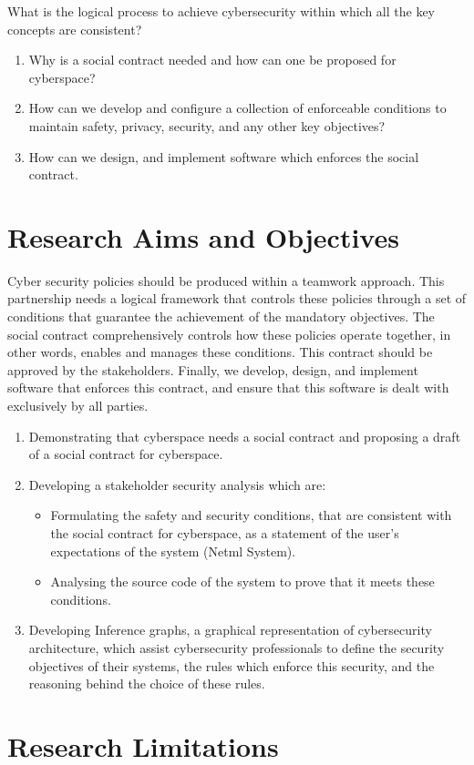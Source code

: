 What is the logical process to achieve cybersecurity within which all the key concepts are consistent?
\begin{enumerate}
\item Why is a social contract needed and how can one be proposed for cyberspace?
\item How can we develop and configure a collection of enforceable conditions to maintain safety, privacy, security, and any other key objectives?
\item How can we design, and implement software which enforces the social contract.%
\end{enumerate}



\section{Research Aims and Objectives}
Cyber security policies should be produced within a teamwork approach.  This partnership needs a logical framework that controls these policies through a set of conditions that guarantee the achievement of the mandatory objectives.  The social contract comprehensively controls how these policies operate together, in other words, enables and manages these conditions.  This contract should be approved by the stakeholders. Finally, we develop, design, and implement software that enforces this contract, and ensure that this software is dealt with exclusively by all parties.
\begin{enumerate}
\item Demonstrating that cyberspace needs a social contract and proposing a draft of a social contract for cyberspace.
\item Developing a stakeholder security analysis which are: 
\begin{itemize}
\item Formulating the safety and security conditions, that are consistent with the social contract for cyberspace, as a statement of the user’s expectations of the system (Netml System).
\item Analysing the source code of the system to prove that it meets these conditions.
\end{itemize}
\item Developing Inference graphs, a graphical representation of cybersecurity architecture, which assist cybersecurity professionals to define the security objectives of their systems, the rules which enforce this security, and the reasoning behind the choice of these rules.
\end{enumerate}
\section{Research Limitations}
